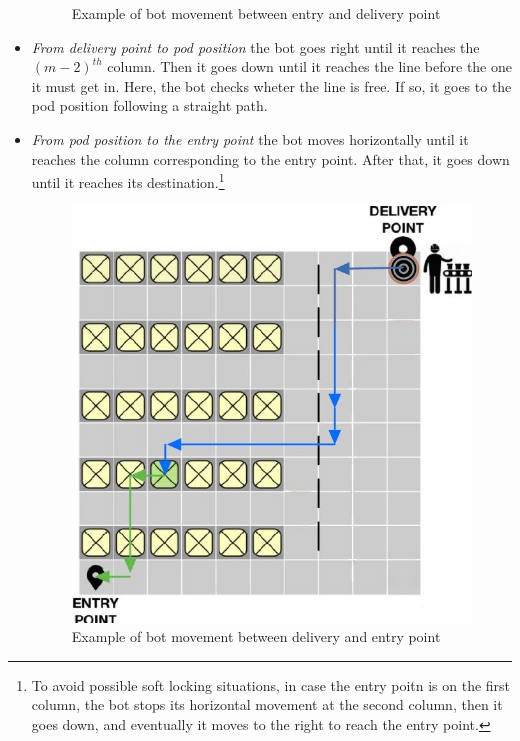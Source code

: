 \documentclass[10pt,a4paper]{article}
\begin{document}
\begin{itemize}
\begin{figure}[ht]
						\caption{Example of bot movement between entry and delivery point}
					\end{figure}
					\item \emph{From delivery point to pod position} the bot goes right until it reaches the ${(m-2)}^{th}$ column. Then it goes down until it reaches the line before the one it must get in. Here, the bot checks wheter the line is free. If so, it goes to the pod position following a straight path.
					\item \emph{From pod position to the entry point} the bot moves horizontally until it reaches the column corresponding to the entry point. After that, it goes down until it reaches its destination.\footnote{To avoid possible soft locking situations, in case the entry poitn is on the first column, the bot stops its horizontal movement at the second column, then it goes down, and eventually it moves to the right to reach the entry point.}
					\begin{figure}[ht]
						\centering
						\includegraphics[scale = 0.36]{Images/BotMovement2.JPG}
						\caption{Example of bot movement between delivery and entry point}
					\end{figure}
				\end{itemize}
\end{document}
